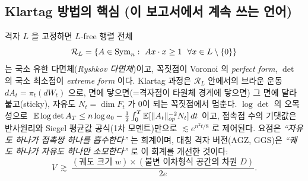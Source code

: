 \subsection{Klartag 방법의 핵심 (이 보고서에서 계속 쓰는 언어)}
격자 $L$ 을 고정하면 $L$-free 행렬 전체
\[
\mathcal R_L=\{A\in\Sym_n:\ Ax\cdot x\ge 1\ \ \forall x\in L\setminus\{0\}\}
\]
는 국소 유한 다면체(\emph{Ryshkov 다면체})이고, 꼭짓점이 Voronoi 의 \emph{perfect form}, $\det$ 의 국소 최소점이 \emph{extreme form} 이다. Klartag 과정은 $\mathcal R_L$ 안에서의 브라운 운동 $dA_t=\pi_t(dW_t)$ 으로, 면에 닿으면(=격자점이 타원체 경계에 닿으면) 그 면에 달라붙고(sticky), 자유도 $N_t=\dim F_t$ 가 0이 되는 꼭짓점에서 멈춘다. $\log\det$ 의 오목성으로
$\ \mathbb{E}\log\det A_T\le n\log a_0-\tfrac12\int_0^T\mathbb{E}[\|A_t\|_{op}^{-2}N_t]\,dt$
이고, 접촉점 수의 기댓값은 반사원리와 Siegel 평균값 공식(1차 모멘트)만으로 $\lesssim e^{n^2t/8}$ 로 제어된다. 요점은 \emph{``자유도 하나가 접촉쌍 하나를 흡수한다''} 는 회계이며, 대칭 격자 버전(AGZ, GGS)은 \emph{``궤도 하나가 자유도 하나만 소모한다''} 로 이 회계를 개선한 것이다:
\[
V\ \gtrsim\ \frac{(\text{궤도 크기 } w)\times(\text{불변 이차형식 공간의 차원 } D)}{2e}.
\]

